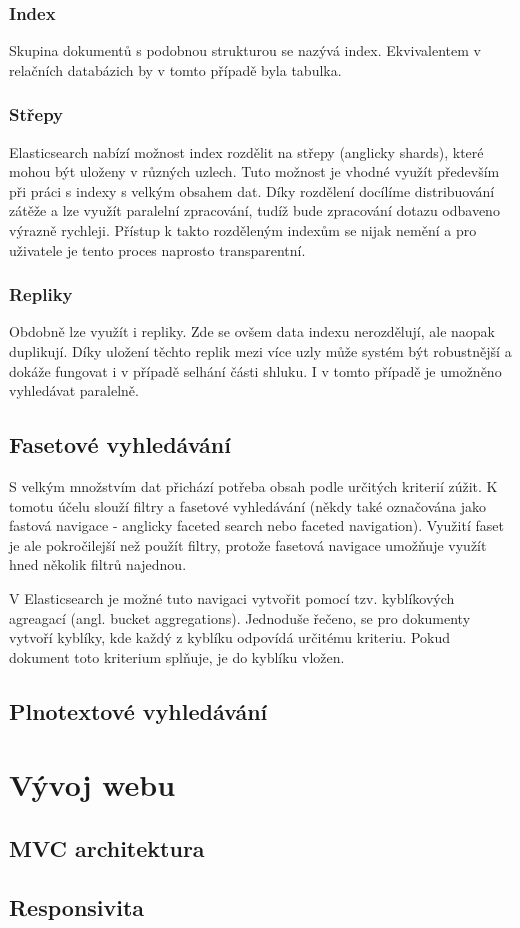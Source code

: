 \subsubsection*{Index}
Skupina dokumentů s podobnou strukturou se nazývá index. Ekvivalentem v relačních databázich by v tomto případě byla tabulka.

\subsubsection*{Střepy}
Elasticsearch nabízí možnost index rozdělit na střepy (anglicky shards), které mohou být uloženy v různých uzlech. Tuto možnost je vhodné využít především při práci s indexy s velkým obsahem dat. Díky rozdělení docílíme distribuování zátěže a lze využít paralelní zpracování, tudíž bude zpracování dotazu odbaveno výrazně rychleji. 
Přístup k takto rozděleným indexům se nijak nemění a pro uživatele je tento proces naprosto transparentní.

\subsubsection*{Repliky}
Obdobně lze využít i repliky. Zde se ovšem data indexu nerozdělují, ale naopak duplikují. Díky uložení těchto replik mezi více uzly může systém být robustnější a dokáže fungovat i v případě selhání části shluku. I v tomto případě je umožněno vyhledávat paralelně. 

\subsection{Fasetové vyhledávání}
S velkým množstvím dat přichází potřeba obsah podle určitých kriterií zúžit. K tomotu účelu slouží filtry a fasetové vyhledávání (někdy také označována jako fastová navigace - anglicky faceted search nebo faceted navigation). Využití faset je ale pokročilejší než použít filtry, protože fasetová navigace umožňuje využít hned několik filtrů najednou. %

V Elasticsearch je možné tuto navigaci vytvořit pomocí tzv. kyblíkových agreagací (angl. bucket aggregations).
Jednoduše řečeno, se pro dokumenty vytvoří kyblíky, kde každý z kyblíku odpovídá určitému kriteriu. Pokud dokument toto kriterium splňuje, je do kyblíku vložen.

\subsection{Plnotextové vyhledávání}
\blindtext[2]



\section{Vývoj webu}
\subsection{MVC architektura}
\blindtext[2]

\subsection{Responsivita}
\blindtext[2]